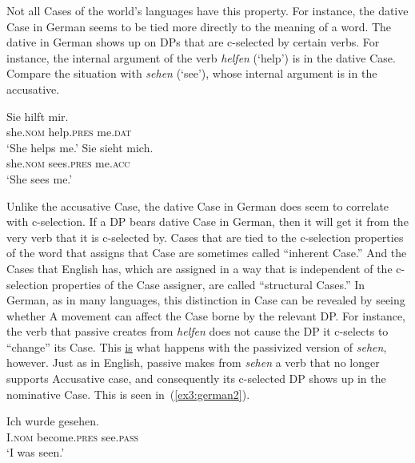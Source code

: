 Not all Cases of the world's languages have this property. For instance, the dative Case in German seems to be tied more directly to the meaning of a word. The dative in German shows up on DPs that are c-selected by certain verbs. For instance, the internal argument of the verb \emph{helfen} (`help') is in the dative Case. Compare the situation with \emph{sehen} (`see'), whose internal argument is in the accusative.
\begin{exe}
	\raggedright
	\ex \label{ex3:german1} 
	\begin{xlist}
		\ex \gll Sie hilft mir. \\ she.\textsc{nom} help.\textsc{pres} me.\textsc{dat} \\ `She helps me.'
		\ex \gll Sie sieht mich. \\ she.\textsc{nom} sees.\textsc{pres} me.\textsc{acc} \\ `She sees me.'
	\end{xlist}
\end{exe}
Unlike the accusative Case, the dative Case in German does seem to correlate with c-selection. If a DP bears dative Case in German, then it will get it from the very verb that it is c-selected by. Cases that are tied to the c-selection properties of the word that assigns that Case are sometimes called ``inherent Case.'' And the Cases that English has, which are assigned in a way that is independent of the c-selection properties of the Case assigner, are called ``structural Cases.'' In German, as in many languages, this distinction in Case can be revealed by seeing whether A movement can affect the Case borne by the relevant DP. For instance, the verb that passive creates from \emph{helfen} does not cause the DP it c-selects to ``change'' its Case. This \underline{is} what happens with the passivized version of \emph{sehen}, however. Just as in English, passive makes from \emph{sehen} a verb that no longer supports Accusative case, and consequently its c-selected DP shows up in the nominative Case. This is seen in~(\ref{ex3:german2}).
\begin{exe}
	\raggedright
	\ex \label{ex3:german2} 
	\gll Ich wurde gesehen. \\ I.\textsc{nom} become.\textsc{pres} see.\textsc{pass} \\ `I was seen.'
\end{exe}
